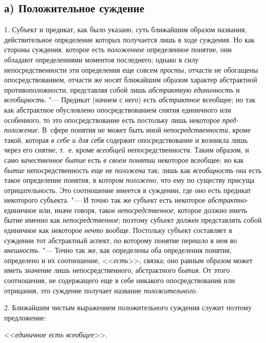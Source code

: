 \subsection[а) Положительное суждение ]{а) Положительное суждение}
1. Субъект и предикат, как было указано, суть ближайшим
образом названия, действительное определение которых получается лишь в ходе
суждения. Но как стороны суждения, которое есть
{\em положенное}
определенное понятие, они обладают определениями моментов
последнего; однако в силу непосредственности эти определения еще совсем
{\em просты}, отчасти не
обогащены опосредствованием, отчасти же носят ближайшим образом характер
абстрактной противоположности, представляя собой лишь
{\em абстрактную единичность}
и {\em всеобщность}. "---
Предикат (начнем с него) есть
{\em абстрактное}
всеобщее; но так как абстрактное обусловлено
опосредствованием снятия единичного или особенного, то это опосредствование
есть постольку лишь некоторое
{\em пред-положение}. В~сфере понятия не может быть иной
{\em непосредственности},
кроме такой, которая
{\em в себе и для себя}
содержит опосредствование и возникла лишь через его снятие,
т.~е. кроме {\em всеобщей}
непосредственности. Таким образом, и само
{\em качественное бытие}
есть {\em в своем
понятии} некоторое всеобщее; но как
{\em бытие}
непосредственность еще не
{\em положена} так; лишь
как {\em всеобщность} она
есть такое определение понятия, в котором
{\em положено}, что ему
по существу присуща отрицательность. Это соотношение имеется в суждении,
где оно есть предикат некоторого субъекта. "--- И точно так же
субъект есть некоторое
{\em абстрактно}{}-единичное
или, иначе говоря, такое
{\em непосредственное},
которое должно иметь бытие именно как
{\em непосредственное};
поэтому субъект должен представлять собой единичное как
некоторое {\em нечто}
вообще. Постольку субъект составляет в суждении тот
абстрактный аспект, по которому понятие перешло в нем во
{\em внешность}. "--- Точно
так же, как определены оба определения понятия, определено и их
соотношение, <<{\em есть}>>,
связка; оно равным образом может иметь значение лишь
непосредственного, абстрактного
{\em бытия}. От этого
соотношения, не содержащего еще в себе никакого опосредствования или
отрицания, это суждение получает название
{\em положительного}.

2. Ближайшим чистым выражением положительного суждения служит
поэтому предложение:

<<{\em единичное есть всеобщее}>>.

